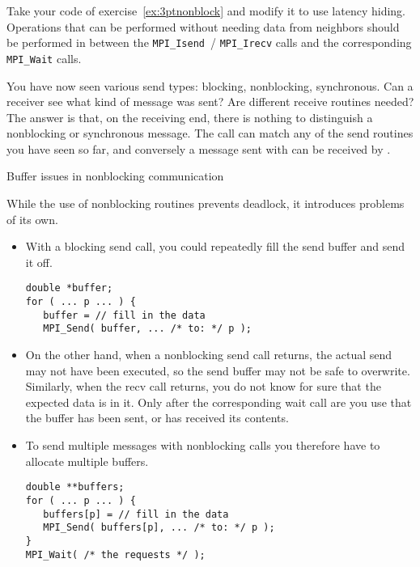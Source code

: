 \begin{exercise}
  \label{ex:3ptnonblock-hide}
  Take your code of exercise~\ref{ex:3ptnonblock} and modify it to use
  latency hiding. Operations that can be performed without needing
  data from neighbors should be performed in between the
  \lstinline{MPI_Isend}~/ \lstinline{MPI_Irecv} calls and the
  corresponding \lstinline{MPI_Wait} calls.
\end{exercise}

\begin{remark}
  You have now seen various send types: blocking, nonblocking, synchronous.
  Can a receiver see what kind of message was sent? Are different receive
  routines needed?
  The answer is that, on the receiving end, there is nothing to distinguish
  a nonblocking or
  synchronous message. The  call can match any of the
  send routines you have seen so far, and
  conversely a message sent with 
  can be received by .
\end{remark}

 {Buffer issues in nonblocking communication}

While the use of nonblocking routines prevents deadlock, it
introduces problems of its own.

\begin{itemize}
\item With a blocking send call, you could repeatedly fill the send
  buffer and send it off.
\begin{lstlisting}
double *buffer;
for ( ... p ... ) {
   buffer = // fill in the data
   MPI_Send( buffer, ... /* to: */ p );
\end{lstlisting}
\item On the other hand, when a nonblocking send call returns,
  the actual send may not have been executed,
  so the send buffer may not be safe to overwrite.
  Similarly, when the recv call returns, you do not know for sure that
  the expected data is in it. Only after the corresponding wait call
  are you use that the buffer has been sent, or has received its contents.
\item 
  To send multiple messages with nonblocking calls
  you therefore have to allocate multiple buffers.
\begin{lstlisting}
double **buffers;
for ( ... p ... ) {
   buffers[p] = // fill in the data
   MPI_Send( buffers[p], ... /* to: */ p );
}
MPI_Wait( /* the requests */ );
\end{lstlisting}
\end{itemize}

